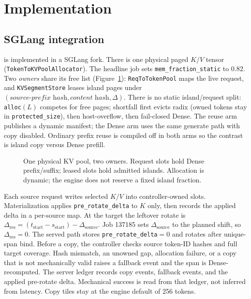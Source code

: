 \section{Implementation}
\label{sec:implementation}

\subsection{SGLang integration}

\method{} is implemented in a SGLang fork. There is one physical paged
$K/V$ tensor (\texttt{TokenToKVPoolAllocator}).
The headline job sets \texttt{mem\_fraction\_static} to $0.82$.
Two \emph{owners} share its free list (Figure~\ref{fig:kv-pools}):
\texttt{ReqToTokenPool} maps the live request, and
\texttt{KVSegmentStore} leases island pages under
$(\textit{source-prefix hash}, \textit{content hash}, \Delta)$.
There is no static island/request split: \texttt{alloc}$(L)$ competes
for free pages; shortfall first evicts radix (owned tokens stay in
\texttt{protected\_size}), then host-overflow, then fail-closed Dense.
The reuse arm publishes a dynamic manifest; the Dense arm uses the same
generate path with copy disabled. Ordinary prefix reuse is compiled off
in both arms so the contrast is island copy versus Dense prefill.

\begin{figure}[ht]
\centering
\resizebox{\columnwidth}{!}{}
\caption{One physical KV pool, two owners. Request slots hold Dense
prefix/suffix; leased slots hold admitted islands. Allocation is
dynamic; the engine does not reserve a fixed island fraction.}
\label{fig:kv-pools}
\end{figure}

Each source request writes selected $K/V$ into controller-owned slots.
Materialization applies \texttt{pre\_rotate\_delta} to $K$ only, then
records the applied delta in a per-source map. At the target the leftover
rotate is
$\Delta_{\mathrm{res}}=(t_{\mathrm{start}}-s_{\mathrm{start}})-\Delta_{\mathrm{source}}$.
Job 137185 sets $\Delta_{\mathrm{source}}$ to the planned shift, so
$\Delta_{\mathrm{res}}=0$. The served path stores
\texttt{pre\_rotate\_delta}${}=0$ and rotates after unique-span bind. Before a copy, the controller checks source token-ID hashes and
full target coverage. Hash mismatch, an unowned gap, allocation failure,
or a copy that is not mechanically valid raises a fallback event and the
span is Dense-recomputed. The server ledger records copy events, fallback events, and the
applied pre-rotate delta. Mechanical success is read from that ledger,
not inferred from latency. Copy tiles stay at the engine default of
256 tokens.

